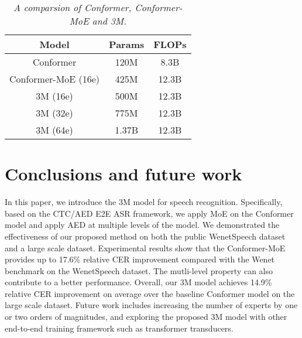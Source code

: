 \documentclass[a4paper]{article}
\begin{document}
\begin{table}
\caption{\textit{CER results on WenetSpeech for public benchmarks and Conformer-MoE} }
\label{tab:1}
\begin{center}
\end{center}
\end{table}





\begin{table}
\caption{\textit{A comparsion of Conformer, Conformer-MoE and 3M. } }
\label{tab:1}
\begin{center}
\begin{tabular}{ccc}
\toprule[2pt]
{Model} & Params & FLOPs \\
 \hline
 Conformer & 120M & 8.3B \\
  Conformer-MoE (16e) & 425M & 12.3B \\
   3M (16e) & 500M & 12.3B \\
   3M (32e) & 775M & 12.3B \\
   3M (64e) & 1.37B & 12.3B \\
\bottomrule[2pt]
\end{tabular}
\end{center}
\end{table}


\section{Conclusions and future work}
In this paper, we introduce the 3M model for speech recognition. Specifically, based on the CTC/AED E2E ASR framework, we apply MoE on the Conformer model and apply AED at multiple levels of the model. We demonstrated the effectiveness of our proposed method on both the public WenetSpeech dataset and a large scale dataset.
Experimental results show that the Conformer-MoE provides up to 17.6\% relative CER improvement compared with the Wenet benchmark on the WenetSpeech dataset.
The mutli-level property can also contribute to a better performance. Overall, our 3M model achieves 14.9\% relative CER improvement on average over the baseline Conformer model on the large scale dataset.  Future work
includes increasing the number of experts by one or two orders of magnitudes, and exploring the proposed 3M model with other end-to-end
training framework such as transformer transducers.







\end{document}
